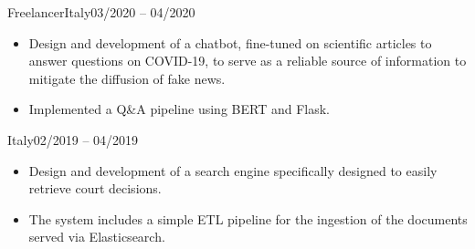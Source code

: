 	\medskip

	{Freelancer}{Italy}{03/2020 – 04/2020}
	\begin{itemize}
            \item Design and development of a chatbot, fine-tuned on scientific articles to answer questions on COVID-19, to serve as a reliable source of information to mitigate the diffusion of fake news.
            \item Implemented a Q\&A pipeline using BERT and Flask.
	\end{itemize}

	\medskip

	{Italy}{02/2019 – 04/2019}
	\begin{itemize}
            \item Design and development of a search engine specifically designed to easily retrieve court decisions.
            \item The system includes a simple ETL pipeline for the ingestion of the documents served via Elasticsearch.
	\end{itemize}
